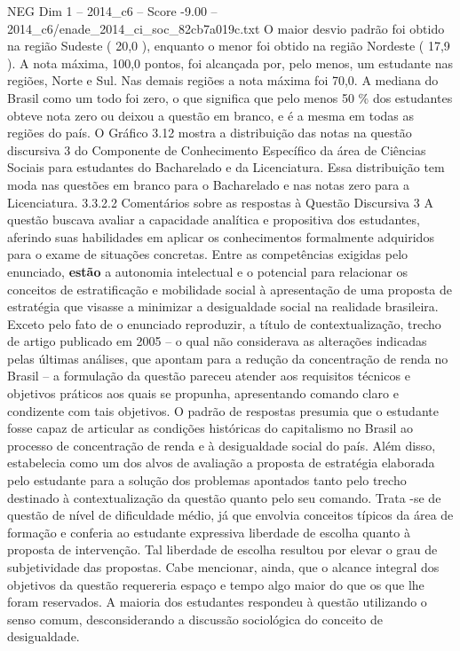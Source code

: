 \begin{textsample}{NEG Dim 1 – 2014\_c6 – Score -9.00 – 2014\_c6/enade\_2014\_ci\_soc\_82cb7a019c.txt}
O maior desvio padrão foi obtido na região Sudeste ( 20,0 ), enquanto o menor foi obtido na região Nordeste ( 17,9 ).
A nota máxima, 100,0 pontos, foi alcançada por, pelo menos, um estudante nas regiões, Norte e Sul.
Nas demais regiões a nota máxima foi 70,0.
A mediana do Brasil como um todo foi zero, o que significa que pelo menos 50 \% dos estudantes obteve nota zero ou deixou a questão em branco, e é a mesma em todas as regiões do país.
O Gráfico 3.12 mostra a distribuição das notas na questão discursiva 3 do Componente de Conhecimento Específico da área de Ciências Sociais para estudantes do Bacharelado e da Licenciatura.
Essa distribuição tem moda nas questões em branco para o Bacharelado e nas notas zero para a Licenciatura. 3.3.2.2 Comentários sobre as respostas à Questão Discursiva 3 A questão buscava avaliar a capacidade analítica e propositiva dos estudantes, aferindo suas habilidades em aplicar os conhecimentos formalmente adquiridos para o exame de situações concretas.
Entre as competências exigidas pelo enunciado, \textbf{estão} a autonomia intelectual e o potencial para relacionar os conceitos de estratificação e mobilidade social à apresentação de uma proposta de estratégia que visasse a minimizar a desigualdade social na realidade brasileira.
Exceto pelo fato de o enunciado reproduzir, a título de contextualização, trecho de artigo publicado em 2005 – o qual não considerava as alterações indicadas pelas últimas análises, que apontam para a redução da concentração de renda no Brasil – a formulação da questão pareceu atender aos requisitos técnicos e objetivos práticos aos quais se propunha, apresentando comando claro e condizente com tais objetivos.
O padrão de respostas presumia que o estudante fosse capaz de articular as condições históricas do capitalismo no Brasil ao processo de concentração de renda e à desigualdade social do país.
Além disso, estabelecia como um dos alvos de avaliação a proposta de estratégia elaborada pelo estudante para a solução dos problemas apontados tanto pelo trecho destinado à contextualização da questão quanto pelo seu comando.
Trata -se de questão de nível de dificuldade médio, já que envolvia conceitos típicos da área de formação e conferia ao estudante expressiva liberdade de escolha quanto à proposta de intervenção.
Tal liberdade de escolha resultou por elevar o grau de subjetividade das propostas.
Cabe mencionar, ainda, que o alcance integral dos objetivos da questão requereria espaço e tempo algo maior do que os que lhe foram reservados.
A maioria dos estudantes respondeu à questão utilizando o senso comum, desconsiderando a discussão sociológica do conceito de desigualdade.

\end{textsample}

